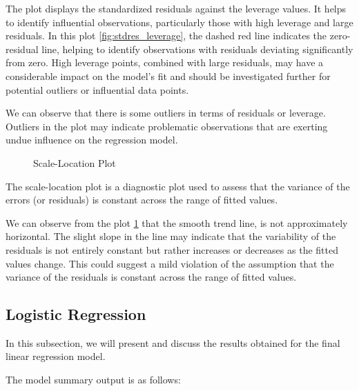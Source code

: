 \documentclass[conference]{IEEEtran}
\begin{document}
\vspace{0.5cm}

The plot displays the standardized residuals against the leverage values. It helps to identify influential observations, particularly those with high leverage and large residuals. In this plot \ref{fig:stdres_leverage}, the dashed red line indicates the zero-residual line, helping to identify observations with residuals deviating significantly from zero. High leverage points, combined with large residuals, may have a considerable impact on the model's fit and should be investigated further for potential outliers or influential data points.

We can observe that there is some outliers in terms of residuals or leverage. Outliers in the plot may indicate problematic observations that are exerting undue influence on the regression model.

\vspace{0.5cm}

\begin{figure}[!h]
      \centering
       {}
      \caption{Scale-Location Plot}
      \label{fig:mlr_scale_location}
\end{figure}

\vspace{0.5cm}

The scale-location plot is a diagnostic plot used to assess  that the variance of the errors (or residuals) is constant across the range of fitted values.

We can observe from the plot \ref{fig:mlr_scale_location} that the smooth trend line, is not approximately horizontal.
The slight slope in the line may indicate that the variability of the residuals is not entirely constant but rather increases or decreases as the fitted values change. This could suggest a mild violation of the assumption that the variance of the residuals is constant across the range of fitted values.

\vspace{0.5cm}

\subsection{Logistic Regression}

In this subsection, we will present and discuss the results obtained for the final linear regression model.

The model summary output is as follows:
\end{document}
